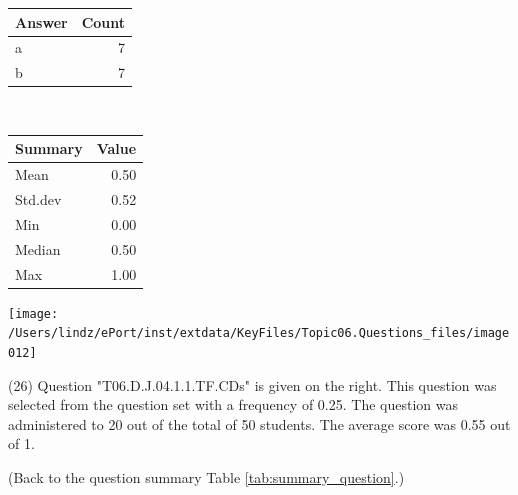 \documentclass[12pt,english,nohyper]{tufte-handout}\usepackage[]{graphicx}\usepackage[]{color}
\begin{document}
\begin{center}%
\begin{tabular}{lr}
  \hline
Answer & Count \\ 
  \hline
a &   7 \\ 
  b &   7 \\ 
   \hline
\end{tabular}
~~~~~~~~%
\begin{tabular}{lr}
  \hline
Summary & Value \\ 
  \hline
Mean & 0.50 \\ 
  Std.dev & 0.52 \\ 
  Min & 0.00 \\ 
  Median & 0.50 \\ 
  Max & 1.00 \\ 
   \hline
\end{tabular}
\end{center}\newpage{}



\vspace{7cm}\begin{marginfigure}\texttt{[image: /Users/lindz/ePort/inst/extdata/KeyFiles/Topic06.Questions\_files/image012]}\end{marginfigure}\vspace{-7cm} (26) Question "T06.D.J.04.1.1.TF.CDs" is given on the right. This question was selected from the question set with a frequency of 0.25. The question was administered to 20 out of the total of 50 students. The average score was 0.55 out of 1.

 (Back to the question summary Table \ref{tab:summary_question}.)
\end{document}
